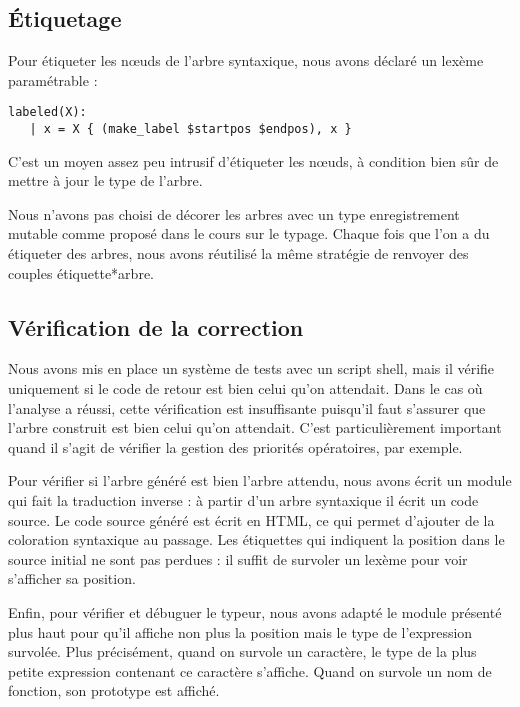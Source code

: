\documentclass[a4paper]{article}
\begin{document}
\subsection{Étiquetage}

Pour étiqueter les nœuds de l'arbre syntaxique, nous avons déclaré un lexème paramétrable :

\begin{verbatim}
labeled(X):
   | x = X { (make_label $startpos $endpos), x }
\end{verbatim}

C'est un moyen assez peu intrusif d'étiqueter les nœuds, à condition bien sûr de mettre à jour le type de l'arbre.

Nous n'avons pas choisi de décorer les arbres avec un type
 enregistrement mutable comme proposé dans le cours sur le typage.
Chaque fois que l'on a du étiqueter des arbres, nous avons réutilisé la
même stratégie de renvoyer des couples étiquette*arbre.

\subsection{Vérification de la correction}
\label{subsec:html}

Nous avons mis en place un système de tests avec un script shell, mais il vérifie uniquement si le code de retour est bien celui qu'on attendait.
Dans le cas où l'analyse a réussi, cette vérification est insuffisante puisqu'il faut s'assurer que l'arbre construit est bien celui qu'on attendait.
C'est particulièrement important quand il s'agit de vérifier la gestion des priorités opératoires, par exemple.

Pour vérifier si l'arbre généré est bien l'arbre attendu, nous avons écrit un module qui fait la traduction inverse :
à partir d'un arbre syntaxique il écrit un code source.
Le code source généré est écrit en HTML, ce qui permet d'ajouter de la coloration syntaxique au passage.
Les étiquettes qui indiquent la position dans le source initial ne sont pas perdues :
il suffit de survoler un lexème pour voir s'afficher sa position.

Enfin, pour vérifier et débuguer le typeur, nous avons adapté le module
présenté plus haut pour qu'il affiche non plus la position mais le type
de l'expression survolée.
Plus précisément, quand on survole un caractère, le type de la plus petite expression contenant ce caractère s'affiche.
Quand on survole un nom de fonction, son prototype est affiché.
\end{document}
